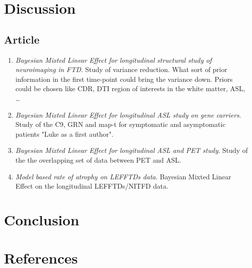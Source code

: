 \documentclass[final, paper=letter,5p,times,twocolumn]{elsarticle}
\theoremstyle{definition}
\begin{document}
\section{Discussion}

\subsection{Article}

\begin{enumerate}
  \item {\it Bayesian Mixted Linear Effect for longitudinal structural study of neuroimaging in FTD}. Study of variance reduction. What sort of prior information in the first time-point could bring the variance down. Priors could be chosen like CDR, DTI region of interests in the white matter, ASL, \dots
  \item {\it Bayesian Mixted Linear Effect for longitudinal ASL study on gene carriers}. Study of the C9, GRN and map-t for symptomatic and asymptomatic patients "Luke as a first author".
  \item {\it Bayesian Mixted Linear Effect for longitudinal ASL and PET study}. Study of the the overlapping set of data between PET and ASL.
  \item {\it Model based rate of atrophy on LEFFTDs data}. Bayesian Mixted Linear Effect on the longitudinal LEFFTDs/NITFD data.
\end{enumerate}


\section{Conclusion}

\section*{References}



\end{document}
